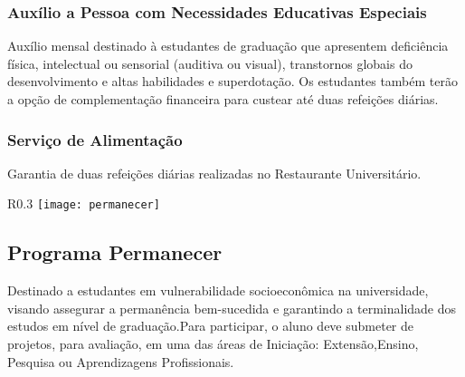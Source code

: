     \subsubsection{Auxílio a Pessoa com Necessidades Educativas Especiais}
        Auxílio mensal destinado à estudantes de graduação que apresentem deficiência física, intelectual ou sensorial (auditiva ou visual), transtornos globais do desenvolvimento e altas habilidades e superdotação.  Os estudantes também terão a opção de complementação financeira para custear até duas refeições diárias.
    \subsubsection{Serviço de Alimentação}
        Garantia de duas refeições diárias realizadas no Restaurante Universitário.
\begin{wrapfigure}{R}{0.3\textwidth}
    \centering
    \texttt{[image: permanecer]}
\end{wrapfigure}
\subsection{Programa Permanecer}
        Destinado a estudantes em vulnerabilidade socioeconômica na universidade, visando assegurar a permanência bem-sucedida e garantindo a terminalidade dos estudos em nível de graduação.Para participar, o aluno deve submeter de projetos, para avaliação, em uma das áreas de Iniciação: Extensão,Ensino, Pesquisa ou Aprendizagens Profissionais. 
